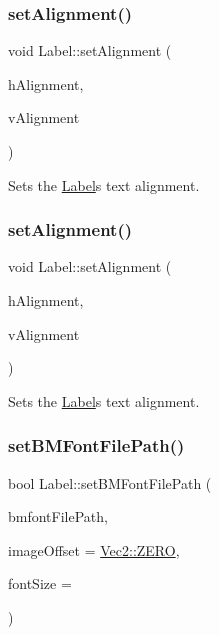 \subsubsection{\texorpdfstring{set\+Alignment()}{setAlignment()}\hspace{0.1cm}{\footnotesize\ttfamily [3/4]}}
{\footnotesize\ttfamily void Label\+::set\+Alignment (\begin{DoxyParamCaption}\item[{Text\+H\+Alignment}]{h\+Alignment,  }\item[{Text\+V\+Alignment}]{v\+Alignment }\end{DoxyParamCaption})}

Sets the \hyperlink{classLabel}{Label}\textquotesingle{}s text alignment. \mbox{\label{classLabel_a3fb693a7db81e6b313a2c9c871f8cf63}} 
\subsubsection{\texorpdfstring{set\+Alignment()}{setAlignment()}\hspace{0.1cm}{\footnotesize\ttfamily [4/4]}}
{\footnotesize\ttfamily void Label\+::set\+Alignment (\begin{DoxyParamCaption}\item[{Text\+H\+Alignment}]{h\+Alignment,  }\item[{Text\+V\+Alignment}]{v\+Alignment }\end{DoxyParamCaption})}

Sets the \hyperlink{classLabel}{Label}\textquotesingle{}s text alignment. \mbox{\label{classLabel_a70382e40203f129a1c50a0557f22ab3e}} 
\subsubsection{\texorpdfstring{set\+B\+M\+Font\+File\+Path()}{setBMFontFilePath()}\hspace{0.1cm}{\footnotesize\ttfamily [1/2]}}
{\footnotesize\ttfamily bool Label\+::set\+B\+M\+Font\+File\+Path (\begin{DoxyParamCaption}\item[{const std\+::string \&}]{bmfont\+File\+Path,  }\item[{const \hyperlink{classVec2}{Vec2} \&}]{image\+Offset = {\ttfamily \hyperlink{classVec2_a5c80e2e7c8bd2adcbad2844d060e6245}{Vec2\+::\+Z\+E\+RO}},  }\item[{float}]{font\+Size = {} }\end{DoxyParamCaption})\hspace{0.3cm}{\ttfamily [virtual]}}

